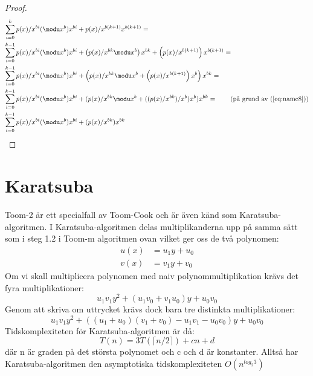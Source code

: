 \begin{proof}
  \begin{align*}
    \sum_{i = 0}^{k} p(x)/x^{bi} (\modu x^b) x^{bi} &+ p(x)/x^{b(k + 1)}  x^{b(k + 1)} =\\
    \sum_{i = 0}^{k-1} p(x)/x^{bi} (\modu x^b) x^{bi} &+
    \left(p(x)/x^{b k} \modu x^b\right) x^{b k} + \left(p(x)/x^{b(k + 1)}\right)  x^{b(k + 1)} = \\
    \sum_{i = 0}^{k-1} p(x)/x^{bi} (\modu x^b) x^{bi} &+
    \left(p(x)/x^{b k} \modu x^b + \left(p(x)/x^{b(k + 1)}\right)  x^b \right) x^{b k} = \\
    \sum_{i = 0}^{k-1} p(x)/x^{bi} (\modu x^b) x^{bi} &+
    (p(x)/x^{b k} \modu x^b + ((p(x)/x^{b k})/x^b)  x^b) x^{b k} =
    \tag{på grund av (\ref{eq:name8})}\\
    \sum_{i = 0}^{k-1} p(x)/x^{bi}  (\modu x^b) x^{bi} &+ (p(x)/x^{b k}) x^{b k}
  \end{align*}
\end{proof}

\section{Karatsuba}
Toom-2 är ett specialfall av Toom-Cook och är även känd som
Karatsuba-algoritmen. I Karatsuba-algoritmen delas multiplikanderna upp på
samma sätt som i steg 1.2 i Toom-m algoritmen ovan vilket ger oss de två
polynomen:
\begin{align*}
  u(x) &= u_1 y + u_0 \\
  v(x) &= v_1 y + v_0
\end{align*}
Om vi skall multiplicera polynomen med naiv polynommultiplikation krävs det
fyra multiplikationer:
\begin{equation*}
  u_1 v_1 y^2 + (u_1 v_0+v_1 u_0) y + u_0 v_0
\end{equation*}
Genom att skriva om uttrycket krävs dock bara tre distinkta multiplikationer:
\begin{equation*}
  u_1 v_1 y^2 + ((u_1 + u_0)(v_1 + v_0) - u_1 v_1 - u_0 v_0) y + u_0 v_0
\end{equation*}
Tidskomplexiteten för Karatsuba-algoritmen är då:
\begin{equation*}
  T(n) = 3 T(\lceil n/2\rceil) + cn + d
\end{equation*}
där n är graden på det största polynomet och c och d är konstanter. Alltså har
Karatsuba-algoritmen den asymptotiska tidskomplexiteten $O(n^{log_2 3})$
